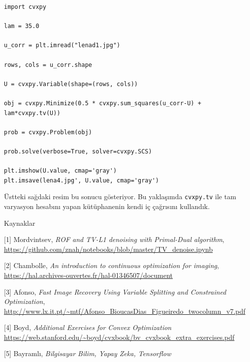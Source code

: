 \documentclass[12pt,fleqn]{article}\usepackage{../../common}
\begin{document}
\begin{verbatim}
import cvxpy

lam = 35.0

u_corr = plt.imread("lenad1.jpg")

rows, cols = u_corr.shape

U = cvxpy.Variable(shape=(rows, cols))

obj = cvxpy.Minimize(0.5 * cvxpy.sum_squares(u_corr-U) + lam*cvxpy.tv(U))

prob = cvxpy.Problem(obj)

prob.solve(verbose=True, solver=cvxpy.SCS)

plt.imshow(U.value, cmap='gray')
plt.imsave(lena4.jpg', U.value, cmap='gray')
\end{verbatim}

Üstteki sağdaki resim bu sonucu gösteriyor. Bu yaklaşımda
\verb!cvxpy.tv! ile tam varyasyon hesabını yapan kütüphanenin kendi iç
çağrısını kullandık. 


Kaynaklar

[1] Mordvintsev, {\em ROF and TV-L1 denoising with Primal-Dual algorithm},
    \url{https://github.com/znah/notebooks/blob/master/TV_denoise.ipynb}

[2] Chambolle, {\em An introduction to continuous optimization for imaging},
    \url{https://hal.archives-ouvertes.fr/hal-01346507/document}

[3] Afonso, {\em Fast Image Recovery Using Variable Splitting and Constrained Optimization},
    \url{http://www.lx.it.pt/~mtf/Afonso_BioucasDias_Figueiredo_twocolumn_v7.pdf}

[4] Boyd, 
    {\em Additional Exercises for Convex Optimization}
    \url{https://web.stanford.edu/~boyd/cvxbook/bv_cvxbook_extra_exercises.pdf}

[5] Bayramlı, 
    {\em Bilgisayar Bilim, Yapay Zeka, Tensorflow}

    
\end{document}
